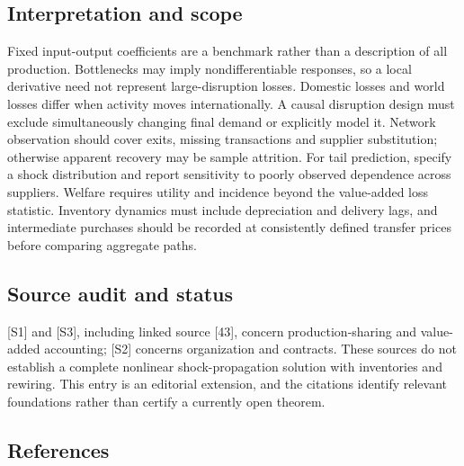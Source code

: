 \documentclass[11pt,a4paper]{article}
\begin{document}
\subsection*{Interpretation and scope}
Fixed input-output coefficients are a benchmark rather than a description of all production. Bottlenecks may imply nondifferentiable responses, so a local derivative need not represent large-disruption losses. Domestic losses and world losses differ when activity moves internationally. A causal disruption design must exclude simultaneously changing final demand or explicitly model it. Network observation should cover exits, missing transactions and supplier substitution; otherwise apparent recovery may be sample attrition. For tail prediction, specify a shock distribution and report sensitivity to poorly observed dependence across suppliers. Welfare requires utility and incidence beyond the value-added loss statistic. Inventory dynamics must include depreciation and delivery lags, and intermediate purchases should be recorded at consistently defined transfer prices before comparing aggregate paths.

\subsection*{Source audit and status}
[S1] and [S3], including linked source [43], concern production-sharing and value-added accounting; [S2] concerns organization and contracts. These sources do not establish a complete nonlinear shock-propagation solution with inventories and rewiring. This entry is an editorial extension, and the citations identify relevant foundations rather than certify a currently open theorem.

\subsection*{References}
\end{document}
